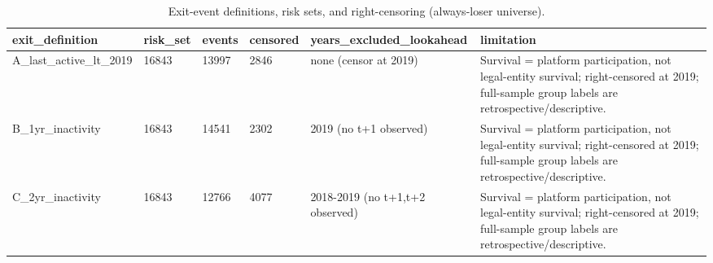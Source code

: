 \begin{table}[htbp]\centering
\caption{Exit-event definitions, risk sets, and right-censoring (always-loser universe).}
\label{tab:B_exit_def}
\begin{tabular}{llllll}
\toprule
exit\_definition & risk\_set & events & censored & years\_excluded\_lookahead & limitation
\\ \midrule
A\_last\_active\_lt\_2019 & 16843 & 13997 & 2846 & none (censor at 2019) & Survival = platform participation, not legal-entity survival; right-censored at 2019; full-sample group labels are retrospective/descriptive. \\
B\_1yr\_inactivity & 16843 & 14541 & 2302 & 2019 (no t+1 observed) & Survival = platform participation, not legal-entity survival; right-censored at 2019; full-sample group labels are retrospective/descriptive. \\
C\_2yr\_inactivity & 16843 & 12766 & 4077 & 2018-2019 (no t+1,t+2 observed) & Survival = platform participation, not legal-entity survival; right-censored at 2019; full-sample group labels are retrospective/descriptive. \\
\bottomrule
\end{tabular}
\end{table}
